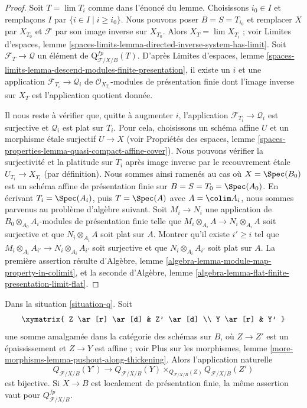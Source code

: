 \begin{proof}
Soit $T = \lim T_i$ comme dans l'énoncé du lemme. Choisissons $i_0 \in I$ et
remplaçons $I$ par $\{i \in I \mid i \geq i_0\}$. Nous pouvons poser
$B = S = T_{i_0}$ et remplacer $X$ par $X_{T_0}$ et $\mathcal{F}$ par son
image inverse sur $X_{T_0}$. Alors $X_T = \lim X_{T_i}$ ; voir Limites
d'espaces, lemme
\ref{spaces-limits-lemma-directed-inverse-system-has-limit}. Soit
$\mathcal{F}_T \to \mathcal{Q}$ un élément de
$\text{Q}^{fp}_{\mathcal{F}/X/B}(T)$. D'après Limites d'espaces, lemme
\ref{spaces-limits-lemma-descend-modules-finite-presentation}, il existe un
$i$ et une application $\mathcal{F}_{T_i} \to \mathcal{Q}_i$ de
$\mathcal{O}_{X_{T_i}}$-modules de présentation finie dont l'image inverse sur
$X_T$ est l'application quotient donnée.

\medskip\noindent
Il nous reste à vérifier que, quitte à augmenter $i$, l'application
$\mathcal{F}_{T_i} \to \mathcal{Q}_i$ est surjective et $\mathcal{Q}_i$ est
plat sur $T_i$. Pour cela, choisissons un schéma affine $U$ et un morphisme
\'etale surjectif $U \to X$ (voir Propriétés des espaces, lemme
\ref{spaces-properties-lemma-quasi-compact-affine-cover}). Nous pouvons
vérifier la surjectivité et la platitude sur $T_i$ après image inverse par le
recouvrement \'etale $U_{T_i} \to X_{T_i}$ (par définition). Nous sommes ainsi
ramenés au cas où $X = \Spec(B_0)$ est un schéma affine de présentation finie
sur $B = S = T_0 = \Spec(A_0)$. En écrivant $T_i = \Spec(A_i)$, puis
$T = \Spec(A)$ avec $A = \colim A_i$, nous sommes parvenus au problème
d'algèbre suivant. Soit $M_i \to N_i$ une application de
$B_0 \otimes_{A_0} A_i$-modules de présentation finie telle que
$M_i \otimes_{A_i} A \to N_i \otimes_{A_i} A$ soit surjective et que
$N_i \otimes_{A_i} A$ soit plat sur $A$. Montrer qu'il existe
$i' \geq i$ tel que
$M_i \otimes_{A_i} A_{i'} \to N_i \otimes_{A_i} A_{i'}$ soit surjective et
que $N_i \otimes_{A_i} A_{i'}$ soit plat sur $A$. La première assertion
résulte d'Algèbre, lemme
\ref{algebra-lemma-module-map-property-in-colimit}, et la seconde d'Algèbre,
lemme \ref{algebra-lemma-flat-finite-presentation-limit-flat}.
\end{proof}

\begin{lemma}
\label{lemma-q-RS-star}
Dans la situation \ref{situation-q}. Soit
$$
\xymatrix{
Z \ar[r] \ar[d] & Z' \ar[d] \\
Y \ar[r] & Y'
}
$$
une somme amalgamée dans la catégorie des schémas sur $B$, où
$Z \to Z'$ est un épaississement et $Z \to Y$ est affine ; voir Plus sur les
morphismes, lemme
\ref{more-morphisms-lemma-pushout-along-thickening}. Alors l'application
naturelle
$$
Q_{\mathcal{F}/X/B}(Y') \longrightarrow
Q_{\mathcal{F}/X/B}(Y) \times_{Q_{\mathcal{F}/X/B}(Z)} Q_{\mathcal{F}/X/B}(Z')
$$
est bijective. Si $X \to B$ est localement de présentation finie, la même
assertion vaut pour $Q^{fp}_{\mathcal{F}/X/B}$.
\end{lemma}

